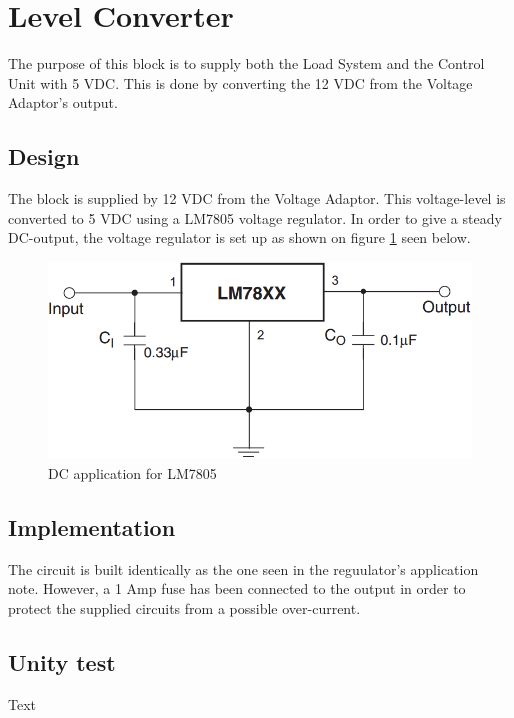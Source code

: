 \section{Level Converter}
The purpose of this block is to supply both the Load System and the Control Unit with 5 VDC. This is done by converting the 12 VDC from the Voltage Adaptor's output.

\subsection{Design}
The block is supplied by 12 VDC from the Voltage Adaptor. This voltage-level is converted to 5 VDC using a LM7805 voltage regulator. In order to give a steady DC-output, the voltage regulator is set up as shown on figure \ref{fig:LM7805_app} seen below.

\begin{figure}[H]
	\centering
	\includegraphics[width=0.5\linewidth]{Hardware/Pictures/LM7805}
	\caption{DC application for LM7805}
	\label{fig:LM7805_app}
\end{figure}

\subsection{Implementation}
The circuit is built identically as the one seen in the reguulator's application note. However, a 1 Amp fuse has been connected to the output in order to protect the supplied circuits from a possible over-current.

\subsection{Unity test}
Text